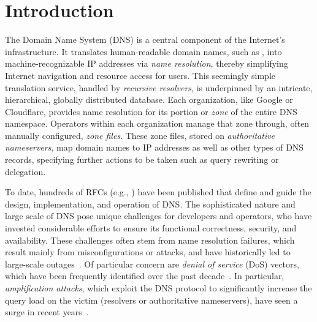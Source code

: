 \section{Introduction} \label{sec:intro}


The Domain Name System (DNS) is a central component of the Internet's infrastructure. 
It translates human-readable domain names, such as , into machine-recognizable IP addresses via \emph{name resolution}, thereby simplifying Internet navigation and resource access for users. 
This seemingly simple translation service,  handled by \emph{recursive resolvers}, is underpinned by an intricate, hierarchical, globally distributed database. 
Each organization, like Google or Cloudflare, 
provides name resolution for its portion or \emph{zone} of the entire DNS namespace.
Operators within each organization manage that zone through,  often manually configured, \emph{zone files}. 
These zone files, 
stored on \emph{authoritative nameservers},
map domain names to IP addresses as well as other types of DNS records, 
specifying further actions to be taken such as query rewriting or delegation. 

To date, hundreds of RFCs (e.g., \cite{rfc1034,rfc1035,rfc6672,rfc2181}) have been published that define and guide the design, implementation, and operation of DNS. 
The sophisticated nature and large scale of DNS pose unique challenges for developers and operators, who have invested considerable efforts to ensure its functional correctness,   security, and availability.
These challenges  often stem from name resolution failures, which result mainly from misconfigurations or  attacks, and have historically led to large-scale outages~\cite{DNS-outage-1,facebook-outage,azure-outage}. Of particular concern are \emph{denial of service} (DoS)  vectors, which have been frequently identified over the past decade~\cite{iDNS,NRDelegationAttack,TUDOOR}. In particular,  \emph{amplification attacks}, which exploit the DNS protocol to significantly 
increase the query load on the victim (resolvers or authoritative nameservers), have seen a surge in recent years~\cite{NXNSAttack,dnsmaude,TsuKing,TsuNAME,camp}.

